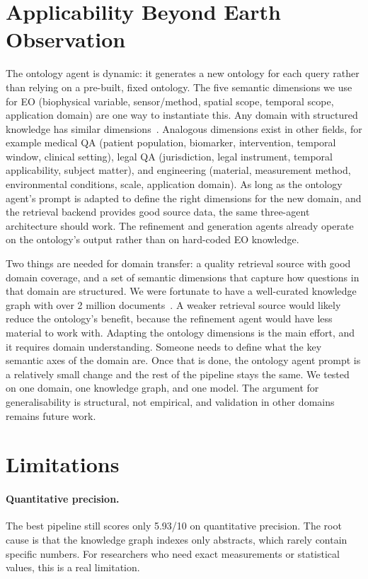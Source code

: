 \section{Applicability Beyond Earth Observation}
\label{sec:discuss-generalisability}

The ontology agent is dynamic: it generates a new ontology for each query rather than relying on a pre-built, fixed ontology. The five semantic dimensions we use for EO (biophysical variable, sensor/method, spatial scope, temporal scope, application domain) are one way to instantiate this. Any domain with structured knowledge has similar dimensions~\citep{opoku2025dorag}. Analogous dimensions exist in other fields, for example medical QA (patient population, biomarker, intervention, temporal window, clinical setting), legal QA (jurisdiction, legal instrument, temporal applicability, subject matter), and engineering (material, measurement method, environmental conditions, scale, application domain). As long as the ontology agent's prompt is adapted to define the right dimensions for the new domain, and the retrieval backend provides good source data, the same three-agent architecture should work. The refinement and generation agents already operate on the ontology's output rather than on hard-coded EO knowledge.

Two things are needed for domain transfer: a quality retrieval source with good domain coverage, and a set of semantic dimensions that capture how questions in that domain are structured. We were fortunate to have a well-curated knowledge graph with over 2 million documents~\citep{elbaff2025earthobservationrag}. A weaker retrieval source would likely reduce the ontology's benefit, because the refinement agent would have less material to work with. Adapting the ontology dimensions is the main effort, and it requires domain understanding. Someone needs to define what the key semantic axes of the domain are. Once that is done, the ontology agent prompt is a relatively small change and the rest of the pipeline stays the same. We tested on one domain, one knowledge graph, and one model. The argument for generalisability is structural, not empirical, and validation in other domains remains future work.


\section{Limitations}
\label{sec:limitations}

\paragraph{Quantitative precision.} The best pipeline still scores only 5.93/10 on quantitative precision. The root cause is that the knowledge graph indexes only abstracts, which rarely contain specific numbers. For researchers who need exact measurements or statistical values, this is a real limitation.

